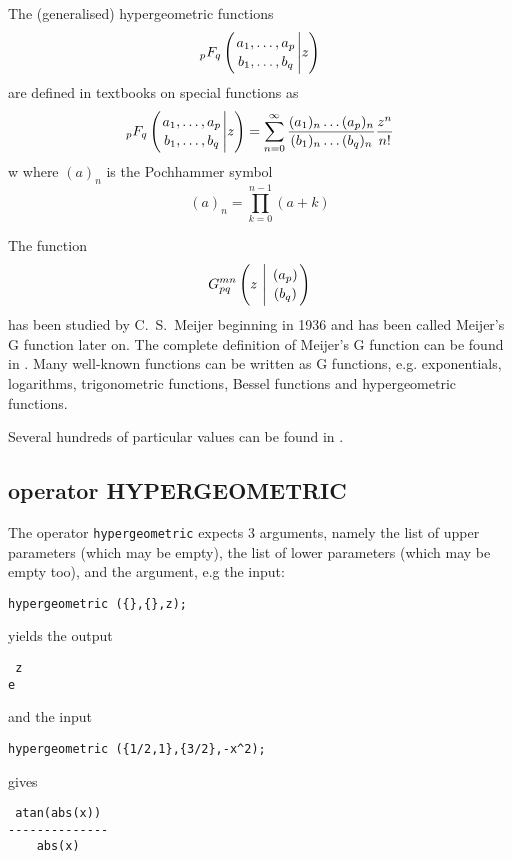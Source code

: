 
The (generalised) hypergeometric functions  
\begin{displaymath}
_pF_q \left( \genfrac{}{}{0pt}{}{a_1, \ldots , a_p}{b_1, \ldots ,b_q} \Bigg\vert z \right)
\end{displaymath}
are defined in textbooks on special functions as
\begin{displaymath}
_pF_q \left( \genfrac{}{}{0pt}{}{a_1, \ldots , a_p}{b_1, \ldots ,b_q} \Bigg\vert z \right)
  = \sum_{n=0}^{\infty}\frac{(a_{1})_{n}\dots(a_{p})_{n}}{(b_{1})_{n}\dots(b_{q})_{n}}\frac{z^{n}}{n!}
\end{displaymath}w
where $(a)_{n}$ is the Pochhammer symbol
\begin{displaymath}
 (a)_{n} = \prod_{k=0}^{n-1} (a+k)
\end{displaymath}

The function 
\begin{displaymath}
G_{p q}^{m n} \left( z \  \Bigg\vert \  \genfrac{}{}{0pt}{}{(a_p)}{(b_q)} \right)
\end{displaymath}
has been studied by C.~S.~Meijer beginning in 1936 and has been
called Meijer's G function later on. The complete definition of Meijer's
G function can be found in \cite{Prudnikov:90}.
Many well-known functions can be written as G functions,
e.g. exponentials, logarithms, trigonometric functions, Bessel functions
and hypergeometric functions.

Several hundreds of particular values can be found in \cite{Prudnikov:90}.


\subsection{\REDUCE{} operator HYPERGEOMETRIC}
\hypertarget{operator:HYPERGEOMETRIC}{}

The operator {\tt hypergeometric} expects 3 arguments, namely the 
list of upper parameters (which may be empty), the list of lower
parameters (which may be empty too), and the argument, e.g the input:
\begin{verbatim}
hypergeometric ({},{},z);
\end{verbatim}
yields the output
\begin{verbatim}
 z
e
\end{verbatim}
and the input
\begin{verbatim}
hypergeometric ({1/2,1},{3/2},-x^2);
\end{verbatim}
gives
\begin{verbatim}
 atan(abs(x))
--------------
    abs(x)
\end{verbatim}



